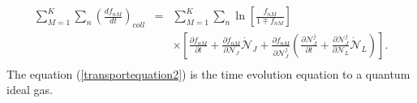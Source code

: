 \documentclass{article}
\begin{document}
\begin{eqnarray}
    \sum_{M=1}^{K}\sum_n \left( \frac{df_{nM}}{dt} \right)_{coll}&=&\sum_{M=1}^{K} \sum_n \ln \left[ \frac{f_{nM}}{1\mp f_{nM}} \right] \nonumber \\
    &&\times \left[ \frac{\partial f_{nM}}{\partial t}+\frac{\partial f_{nM}}{\partial \mathcal{N}_J}\dot{\mathcal{N}}_J+\frac{\partial f_{nM}}{\partial \mathcal{N}_J^{j}}\left( \frac{\partial \mathcal{N}_J^{j}}{\partial t}+\frac{\partial \mathcal{N}_J^{j}}{\partial \mathcal{N}_L}\dot{\mathcal{N}}_L \right) \right].  \nonumber \\ \label{transportequation2}
\end{eqnarray}
The equation (\ref{transportequation2}) is the time evolution equation to a quantum ideal gas. 

  





\end{document}
